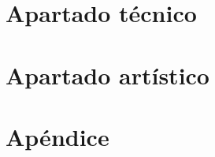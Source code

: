 \documentclass[a4paper,11pt,titlepage]{book}
\begin{document}
        


        
\chapter{Apartado técnico}
\label{chap:tecnico}


\chapter{Apartado artístico}
\label{chap:artistico}


    
\chapter{Apéndice}
\label{chap:apendice}

   

\end{document}
